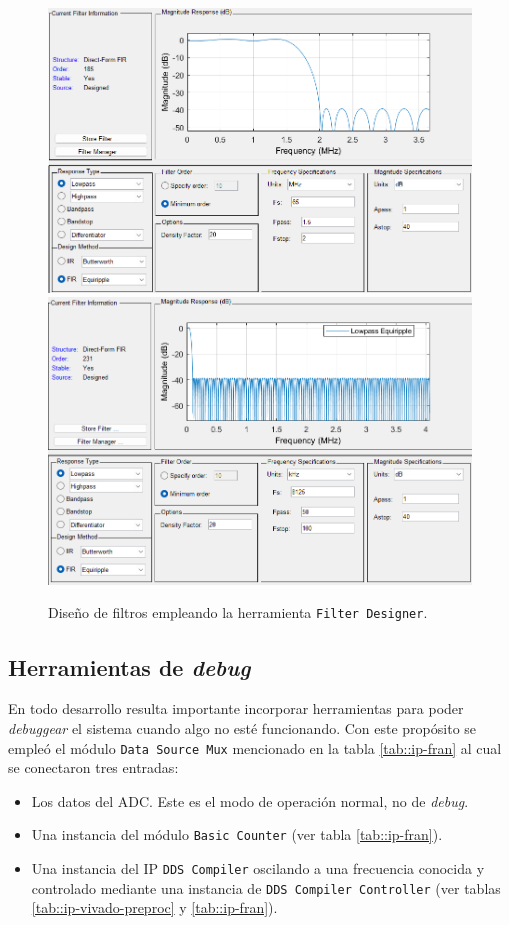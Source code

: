 \documentclass[../../main.tex]{subfiles}
\begin{document}
\begin{figure}[H]
    \centering
    {\includegraphics[width=0.7\linewidth]{band-filter.png}}
    \\[1PC]
    {\includegraphics[width=0.7\linewidth]{beam-filter-old.png}}
    \caption{Diseño de filtros empleando la herramienta \texttt{Filter Designer}.}
    \label{fig::filter-designs-old}
\end{figure}

\subsection{Herramientas de \textit{debug}}\label{subsec::debug-preproc-inicial}
En todo desarrollo resulta importante incorporar herramientas para poder \textit{debuggear} el sistema cuando algo no esté funcionando. Con este propósito se empleó el módulo \texttt{Data Source Mux} mencionado en la tabla \ref{tab::ip-fran} al cual se conectaron tres entradas:
\begin{itemize}
    \item Los datos del ADC. Este es el modo de operación normal, no de \textit{debug}.
    \item Una instancia del módulo \texttt{Basic Counter} (ver tabla \ref{tab::ip-fran}).
    \item Una instancia del IP \texttt{DDS Compiler} oscilando a una frecuencia conocida y controlado mediante una instancia de \texttt{DDS Compiler Controller} (ver tablas \ref{tab::ip-vivado-preproc} y \ref{tab::ip-fran}).
\end{itemize}
\end{document}
